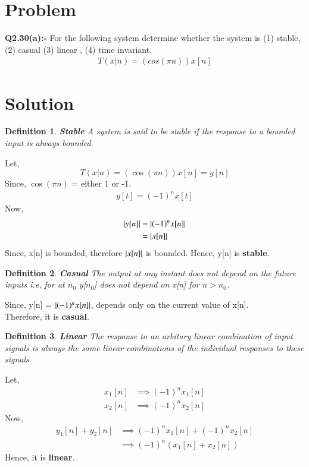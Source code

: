 \documentclass[journal,12pt,twocolumn]{IEEEtran}
\newtheorem{definition}{Definition}
\begin{document}
\section*{\textbf{Problem}}\textbf{Q2.30(a):-}
For the following system determine whether the system is (1) stable, (2) casual (3) linear , (4) time invariant.
\begin{align}
    T(x|n)=(cos(\pi n))x[n]
\end{align}

\section*{\textbf{Solution}}

\begin{definition}{\textbf{Stable}}
A system is said to be stable if the response to a bounded input is always bounded.
\end{definition} 
Let,
\begin{equation}
    T(x|n)=(\cos(\pi n))x[n] = y[n]
\end{equation}
Since, $\cos{(\pi n)}$ = either 1 or -1.
\begin{align}
    y[t] = (-1)^{n}x[t]
\end{align}
Now,
\begin{align}
    \vert y[n]\vert &= \vert(-1)^{n}x[n]\vert\\
               &= \vert x[n]\vert
\end{align}
Since, x[n] is bounded, therefore $\vert x[n]\vert$ is bounded.
Hence, y[n] is \textbf{stable}.

\begin{definition}{\textbf{Casual}}
 The output at any instant does not depend on the future inputs i.e, for at $n_{0}$ y[$n_{0}$] does not depend on x[n] for $n>n_{0}$.
\end{definition}
Since, y[n] = $\vert(-1)^{n}x[n]\vert$, depends only on the current value of x[n].\\
Therefore, it is \textbf{casual}.


\begin{definition}{\textbf{Linear}}
The response to an arbitary linear combination of input signals is always the same linear combinations of the individual responses to these signals 
\end{definition}
Let,
\begin{align}
    x_1[n] &\implies (-1)^{n}x_1[n]\\
    x_2[n] &\implies (-1)^{n}x_2[n]
\end{align}
Now,
\begin{align}
    y_1[n] + y_2[n] &\implies (-1)^{n}x_1[n] + (-1)^{n}x_2[n]\\
                    &\implies (-1)^{n}(x_1[n] + x_2[n])
\end{align}
Hence, it is \textbf{linear}. 
\end{document}
